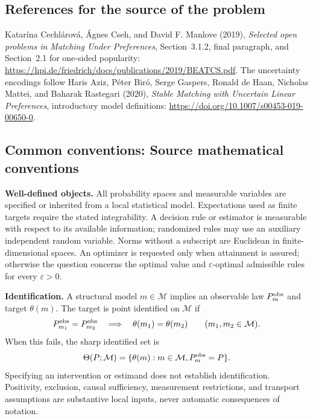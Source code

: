 \documentclass[11pt,a4paper]{article}
\begin{document}
\subsection*{References for the source of the problem}
Katar\'ina Cechl\'arov\'a, \'Agnes Cseh, and David F. Manlove (2019), \emph{Selected open problems in Matching Under Preferences}, Section~3.1.2, final paragraph, and Section~2.1 for one-sided popularity: \url{https://hpi.de/friedrich/docs/publications/2019/BEATCS.pdf}. The uncertainty encodings follow Haris Aziz, P\'eter Bir\'o, Serge Gaspers, Ronald de Haan, Nicholas Mattei, and Baharak Rastegari (2020), \emph{Stable Matching with Uncertain Linear Preferences}, introductory model definitions: \url{https://doi.org/10.1007/s00453-019-00650-0}.

\subsection*{Common conventions: Source mathematical conventions}

\textbf{Well-defined objects.}
All probability spaces and measurable variables are specified or inherited
from a local statistical model. Expectations used as finite targets require
the stated integrability. A decision rule or estimator is measurable with
respect to its available information; randomized rules may use an auxiliary
independent random variable. Norms without a subscript are Euclidean in
finite-dimensional spaces. An optimizer is requested only when attainment
is assured; otherwise the question concerns the optimal value and
$\varepsilon$-optimal admissible rules for every $\varepsilon>0$.

\textbf{Identification.}
A structural model $m\in\mathcal M$ implies an observable law
$P_m^{\rm obs}$ and target $\theta(m)$. The target is point identified on
$\mathcal M$ if
\[
 P_{m_1}^{\rm obs}=P_{m_2}^{\rm obs}
 \quad\Longrightarrow\quad\theta(m_1)=\theta(m_2)
 \qquad(m_1,m_2\in\mathcal M).
\]
When this fails, the sharp identified set is
\[
 \Theta(P;\mathcal M)=\{\theta(m):m\in\mathcal M,
                                  P_m^{\rm obs}=P\}.
\]
Specifying an intervention or estimand does not establish identification.
Positivity, exclusion, causal sufficiency, measurement restrictions, and
transport assumptions are substantive local inputs, never automatic
consequences of notation.
\end{document}

